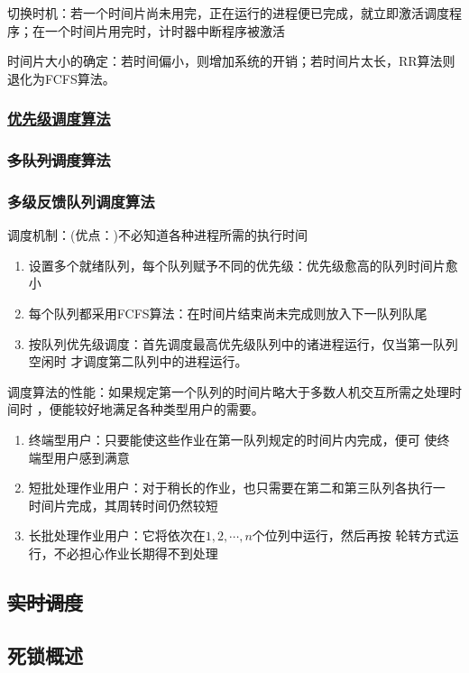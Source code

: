 \documentclass{article}
\begin{document}
切换时机：若一个时间片尚未用完，正在运行的进程便已完成，就立即激活调度程序；在一个时间片用完时，计时器中断程序被激活

时间片大小的确定：若时间偏小，则增加系统的开销；若时间片太长，RR算法则退化为FCFS算法。
\subsubsection{\hyperref[优先级调度算法]{优先级调度算法}}
\subsubsection{\sout{多队列调度算法}}
\subsubsection{{\color{red}多级反馈队列调度算法}}
调度机制：{\color{red}(优点：)不必知道各种进程所需的执行时间}
\begin{enumerate}
    \item 设置多个就绪队列，每个队列赋予不同的优先级：优先级愈高的队列时间片愈小
    \item 每个队列都采用FCFS算法：在时间片结束尚未完成则放入下一队列队尾
    \item 按队列优先级调度：首先调度最高优先级队列中的诸进程运行，仅当第一队列空闲时
    才调度第二队列中的进程运行。
\end{enumerate}

调度算法的性能：如果规定第一个队列的时间片略大于多数人机交互所需之处理时间时
，便能较好地满足各种类型用户的需要。
\begin{enumerate}
    \item 终端型用户：只要能使这些作业在第一队列规定的时间片内完成，便可
    使终端型用户感到满意
    \item 短批处理作业用户：对于稍长的作业，也只需要在第二和第三队列各执行一
    时间片完成，其周转时间仍然较短
    \item 长批处理作业用户：它将依次在$1,2,\cdots,n$个位列中运行，然后再按
    轮转方式运行，不必担心作业长期得不到处理
\end{enumerate}

\subsection{\sout{实时调度}}
\subsection{死锁概述}
\end{document}
